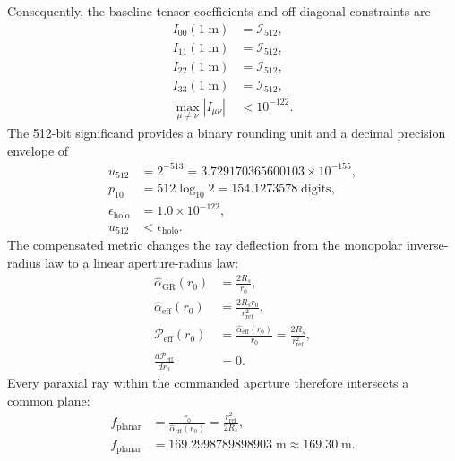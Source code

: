 \documentclass[10pt,twocolumn]{IEEEtran}
\begin{document}
Consequently, the baseline tensor coefficients and off-diagonal constraints are
\begin{equation}
\begin{aligned}
I_{00}(1\;\mathrm{m})&=\mathcal I_{512}, \\
I_{11}(1\;\mathrm{m})&=\mathcal I_{512}, \\
I_{22}(1\;\mathrm{m})&=\mathcal I_{512}, \\
I_{33}(1\;\mathrm{m})&=\mathcal I_{512}, \\
\max_{\mu\neq\nu}\left|I_{\mu\nu}\right|&<10^{-122}.
\end{aligned}
\label{eq:exact_tensor_coefficients}
\end{equation}
The 512-bit significand provides a binary rounding unit and a decimal precision envelope of
\begin{equation}
\begin{aligned}
u_{512}&=2^{-513}=3.729170365600103\times10^{-155}, \\
p_{10}&=512\log_{10}2=154.1273578\;\mathrm{digits}, \\
\epsilon_{\mathrm{holo}}&=1.0\times10^{-122}, \\
u_{512}&<\epsilon_{\mathrm{holo}}.
\end{aligned}
\label{eq:precision_margin}
\end{equation}
The compensated metric changes the ray deflection from the monopolar inverse-radius law to a linear aperture-radius law:
\begin{equation}
\begin{aligned}
\widehat{\alpha}_{\mathrm{GR}}(r_0)&=\frac{2R_s}{r_0}, \\
\widehat{\alpha}_{\mathrm{eff}}(r_0)
&=\frac{2R_s r_0}{r_{\mathrm{ref}}^2}, \\
\mathcal P_{\mathrm{eff}}(r_0)
&=\frac{\widehat{\alpha}_{\mathrm{eff}}(r_0)}{r_0}
=\frac{2R_s}{r_{\mathrm{ref}}^2}, \\
\frac{d\mathcal P_{\mathrm{eff}}}{dr_0}&=0.
\end{aligned}
\label{eq:planarization}
\end{equation}
Every paraxial ray within the commanded aperture therefore intersects a common plane:
\begin{equation}
\begin{aligned}
f_{\mathrm{planar}}
&=\frac{r_0}{\widehat{\alpha}_{\mathrm{eff}}(r_0)}
=\frac{r_{\mathrm{ref}}^2}{2R_s}, \\
f_{\mathrm{planar}}
&=169.2998789898903\;\mathrm{m}
\approx169.30\;\mathrm{m}.
\end{aligned}
\label{eq:planar_focal_surface}
\end{equation}
\end{document}
